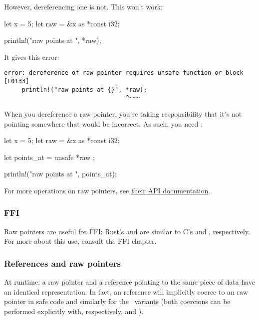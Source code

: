 However, dereferencing one is not. This won't work:

\begin{rustc}
let x = 5;
let raw = &x as *const i32;

println!("raw points at {}", *raw);
\end{rustc}

It gives this error:

\begin{verbatim}
error: dereference of raw pointer requires unsafe function or block [E0133]
     println!("raw points at {}", *raw);
                                  ^~~~
\end{verbatim}

When you dereference a raw pointer, you're taking responsibility that it's not pointing somewhere that would be incorrect. 
As such, you need :

\begin{rustc}
let x = 5;
let raw = &x as *const i32;

let points_at = unsafe { *raw };

println!("raw points at {}", points_at);
\end{rustc}

For more operations on raw pointers, see \href{https://doc.rust-lang.org/std/primitive.pointer.html}{their API documentation}.

\subsubsection*{FFI}

Raw pointers are useful for FFI: Rust's  and  are similar to C's  and , respectively. 
For more about this use, consult the FFI chapter.

\subsubsection*{References and raw pointers}

At runtime, a raw pointer \code{*} and a reference pointing to the same piece of data have an identical representation. In fact, an 
 reference will implicitly coerce to an  raw pointer in safe code and similarly for the \mut\ variants (both 
coercions can be performed explicitly with, respectively,  and ).

\blank

